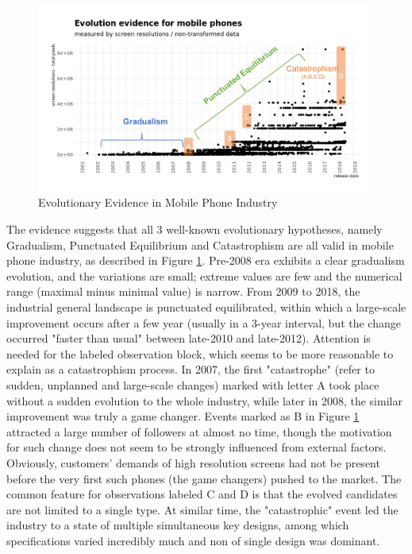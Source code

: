 \documentclass[utf8,english]{gradu3}
\begin{document}
\begin{figure}[htb]
    \centering
    \includegraphics[width=0.99\textwidth]{evo.png}
    \caption{Evolutionary Evidence in Mobile Phone Industry}
    \label{fig:evoMethods}
\end{figure}

The evidence suggests that all 3 well-known evolutionary hypotheses, namely Gradualism, Punctuated Equilibrium and Catastrophism are all valid in mobile phone industry, as described in Figure \ref{fig:evoMethods}. Pre-2008 era exhibits a clear gradualism evolution, and the variations are small; extreme values are few and the numerical range (maximal minus minimal value) is narrow. From 2009 to 2018, the industrial general landscape is punctuated equilibrated, within which a large-scale improvement occurs after a few year (usually in a 3-year interval, but the change occurred "faster than usual" between late-2010 and late-2012). Attention is needed for the labeled observation block, which seems to be more reasonable to explain as a catastrophism process. In 2007, the first "catastrophe" (refer to sudden, unplanned and large-scale changes) marked with letter A took place without a sudden evolution to the whole industry, while later in 2008, the similar improvement was truly a game changer. Events marked as B in Figure \ref{fig:evoMethods} attracted a large number of followers at almost no time, though the motivation for such change does not seem to be strongly influenced from external factors. Obviously, customers' demands of high resolution screens had not be present before the very first such phones (the game changers) pushed to the market. The common feature for observations labeled C and D is that the evolved candidates are not limited to a single type. At similar time, the "catastrophic" event led the industry to a state of multiple simultaneous key designs, among which specifications varied incredibly much and non of single design was dominant. 
\end{document}
